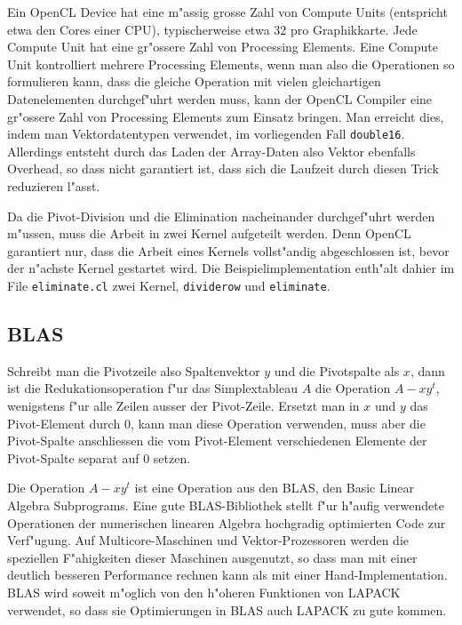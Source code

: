 Ein OpenCL Device hat eine m"assig grosse Zahl von Compute Units (entspricht
etwa den Cores einer CPU), typischerweise etwa 32 pro Graphikkarte. Jede
Compute Unit hat eine gr"ossere Zahl von Processing Elements. Eine Compute
Unit kontrolliert mehrere Processing Elements, wenn man also die
Operationen so formulieren kann, dass die gleiche Operation mit vielen
gleichartigen Datenelementen durchgef"uhrt werden muss, kann der
OpenCL Compiler eine gr"ossere Zahl von Processing Elements zum Einsatz
bringen. Man erreicht dies, indem man Vektordatentypen verwendet, 
im vorliegenden Fall {\tt double16}. Allerdings entsteht durch das 
Laden der Array-Daten also Vektor ebenfalls Overhead, so dass nicht
garantiert ist, dass sich die Laufzeit durch diesen Trick reduzieren
l"asst.

Da die Pivot-Division und die Elimination nacheinander durchgef"uhrt
werden m"ussen, muss die Arbeit in zwei Kernel aufgeteilt werden.
Denn OpenCL garantiert nur, dass die Arbeit eines Kernels vollst"andig
abgeschlossen ist, bevor der n"achste Kernel gestartet wird.
Die Beispielimplementation enth"alt dahier im File \verb+eliminate.cl+
zwei Kernel, {\tt dividerow} und {\tt eliminate}.

\subsection{BLAS}
Schreibt man die Pivotzeile also Spaltenvektor $y$ und
die Pivotspalte als $x$, dann ist die Redukationsoperation
f"ur das Simplextableau $A$ die Operation
$ A-xy^t $, wenigstens f"ur alle Zeilen ausser der Pivot-Zeile.
Ersetzt man in $x$ und $y$ das Pivot-Element durch $0$, kann man diese 
Operation verwenden, muss aber die Pivot-Spalte anschliessen die
vom Pivot-Element verschiedenen Elemente der Pivot-Spalte separat
auf $0$ setzen.

Die Operation $A-xy^t$ ist eine Operation aus den BLAS, den
Basic Linear Algebra Subprograms.
Eine gute BLAS-Bibliothek stellt f"ur h"aufig verwendete Operationen
der numerischen linearen Algebra hochgradig optimierten Code 
zur Verf"ugung.
Auf Multicore-Maschinen und Vektor-Prozessoren werden die speziellen
F"ahigkeiten dieser Maschinen ausgenutzt, so dass man mit einer
deutlich
besseren Performance rechnen kann als mit einer Hand-Implementation.
BLAS wird soweit m"oglich von den h"oheren Funktionen von LAPACK verwendet,
so dass sie Optimierungen in BLAS auch LAPACK zu gute kommen. 

